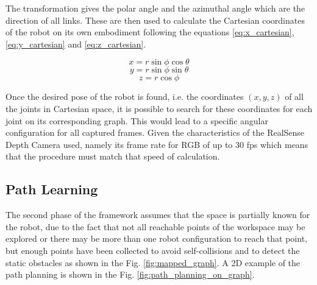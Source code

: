 \documentclass[thesis]{mas_proposal}
\begin{document}
	The transformation gives the polar angle and the azimuthal angle which are the direction of all links. These are then used to calculate the Cartesian coordinates of the robot on its own embodiment following the equations \ref{eq:x_cartesian}, \ref{eq:y_cartesian} and \ref{eq:z_cartesian}. 

\begin{equation}
	x = r \sin \phi \cos \theta
	\label{eq:x_cartesian}
\end{equation}
\begin{equation}
	y = r \sin \phi \sin \theta
	\label{eq:y_cartesian}
\end{equation}
\begin{equation}
	z = r \cos \phi
	\label{eq:z_cartesian}
\end{equation}

	Once the desired pose of the robot is found, i.e. the coordinates $(x,y,z)$ of all the joints in Cartesian space, it is possible to search for these coordinates for each joint on its corresponding graph. This would lead to a specific angular configuration for all captured frames. Given the characteristics of the RealSense Depth Camera used, namely its frame rate for RGB of up to 30 fps \cite{realsense_manual} which means that the procedure must match that speed of calculation. 

\subsection{Path Learning}

	The second phase of the framework assumes that the space is partially known for the robot, due to the fact that not all reachable points of the workspace may be explored or there may be more than one robot configuration to reach that point, but enough points have been collected to avoid self-collisions and to detect the static obstacles as shown in the Fig. \ref{fig:mapped_graph}. A 2D example of the path planning is shown in the Fig. \ref{fig:path_planning_on_graph}. 
\end{document}
